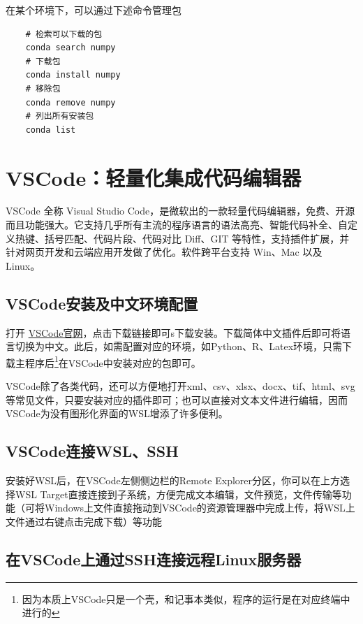 在某个环境下，可以通过下述命令管理包
\begin{lstlisting}
    # 检索可以下载的包
    conda search numpy
    # 下载包
    conda install numpy  
    # 移除包
    conda remove numpy  
    # 列出所有安装包
    conda list
\end{lstlisting}


\section{VSCode：轻量化集成代码编辑器}
VSCode 全称 Visual Studio Code，是微软出的一款轻量代码编辑器，免费、开源而且功能强大。它支持几乎所有主流的程序语言的语法高亮、智能代码补全、自定义热键、括号匹配、代码片段、代码对比 Diff、GIT 等特性，支持插件扩展，并针对网页开发和云端应用开发做了优化。软件跨平台支持 Win、Mac 以及 Linux。

\subsection{VSCode安装及中文环境配置}
打开 \href{https://code.visualstudio.com/}{VSCode官网}，点击下载链接即可s下载安装。下载简体中文插件后即可将语言切换为中文。此后，如需配置对应的环境，如Python、R、Latex环境，只需下载主程序后\footnote{因为本质上VSCode只是一个壳，和记事本类似，程序的运行是在对应终端中进行的}在VSCode中安装对应的包即可。

\begin{remark}
    VSCode除了各类代码，还可以方便地打开xml、csv、xlsx、docx、tif、html、svg等常见文件，只要安装对应的插件即可；也可以直接对文本文件进行编辑，因而VSCode为没有图形化界面的WSL增添了许多便利。
\end{remark}

\subsection{VSCode连接WSL、SSH}
安装好WSL后，在VSCode左侧侧边栏的Remote Explorer分区，你可以在上方选择WSL Target直接连接到子系统，方便完成文本编辑，文件预览，文件传输等功能（可将Windows上文件直接拖动到VSCode的资源管理器中完成上传，将WSL上文件通过右键点击完成下载）等功能



\subsection{在VSCode上通过SSH连接远程Linux服务器}
